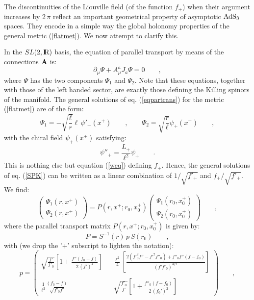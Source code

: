 \documentclass[a4paper,10pt]{article}
\begin{document}
The discontinuities of the Liouville field (of the function $f_\pm$) 
when their argument increases by $2\, \pi$
reflect an important geometrical
property of asymptotic $\rm AdS_3$ spaces. They encode in a simple way
the global holonomy properties of the general metric (\ref{flatmet}).
We now attempt to clarify this.

In the $SL(2,{\hbox{{\rm I}\kern-.2em\hbox{\rm R}}})$ basis, the equation of parallel
transport by means of the connections $\bf A$ is:
\begin{equation}
\label{eqpartrans}
\partial_\mu \Psi + A_\mu^a J_a \Psi =0 \qquad ,
\end{equation}
where $\Psi$ has the two components $\Psi_1$ and $\Psi_2$.
Note that
these equations, together with those of the left handed sector,
 are exactly those defining the 
Killing spinors of the manifold. The general solutions of eq. 
(\ref{eqpartrans})
for the metric (\ref{flatmet}) are of the form:
\begin{equation}
\label{psi1psi2}
\Psi_1= - \sqrt{\frac \ell r} \ell \,  \psi'_+(x^+) \qquad , \qquad 
\Psi_2= \sqrt{\frac r \ell} \psi_+(x^+) 
\qquad , 
\end{equation}
with the chiral field $\psi_+(x^+)$ satisfying:
\begin{equation}
\label{SPK}
\psi''_+ = \frac {L_+} {\ell^2} \psi_+
\qquad .
\end{equation}
This is nothing else but equation (\ref{weq}) defining $f_+$.
Hence, the general solutions of eq. (\ref{SPK}) can be
written as a linear combination of $1/\sqrt{f'_+}$ and
$f_+/\sqrt{f'_+}$. We find:
\begin{equation}
\left(\begin{array}{c} \Psi_1(r,x^+) \\ \Psi_2(r,x^+) \end{array}\right)
=P(r,x^+;r_0,x^+_0)\left(\begin{array}{c} \Psi_1(r_0,x^+_0) \\ \Psi_2(r_0,x^+_0) \end{array}\right)
\qquad ,
\end{equation}
where the parallel transport matrix $P(r,x^+;r_0,x^+_0)$ is given by:
\begin{equation}
P= S^{-1}(r) \, p \, S(r_0)   \qquad , 
\end{equation}
with (we drop the '+' subscript to lighten the notation):
\begin{equation}
\label{holomat} 
p=
 \left(\begin{array}{lcr} 
\sqrt{\frac { f'}{ f'_0 }}
\left[1 + \frac {f''(f_0-f)}{2 \, (f')^2} \right] & &
\frac{\ell^2}{4} \left[ 
\frac{ 2({f'}_0^2 f'' - {f'}^2 f''_0) + f''_0 f'' (f-f_0)}
{ (f' f'_0)^{3/2}} \right] \\ & & \\
\frac{1}{\ell^2} \frac {(f_0-f)}{\sqrt{f'_0 f'}} & &
\sqrt{\frac { f'_0}{f' }}\left[1+
 \frac {f''_0 (f-f_0)}{2 \,(f_0')^2 }\right]  \end{array}\right) \qquad ,
\end{equation}
\end{document}
